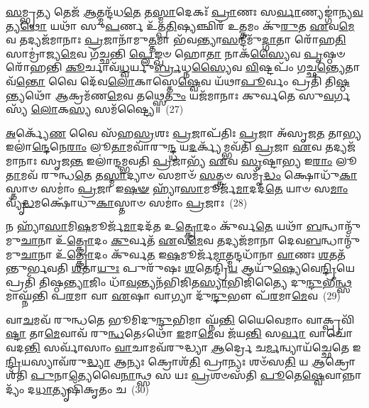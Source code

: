 {%
\-\ul{𑌸}\-𑌮𑍍𑌭𑍃\-\ul{𑌤𑍍𑌯} 𑌤𑍇𑌜᳴ \ul{𑌆}\-𑌤𑍍𑌮𑌨𑍍𑌦᳴𑌧\-\ul{𑌤𑍇} 𑌤\-\ul{𑌸𑍍𑌮𑌾}\-𑌦𑍇𑌕𑌃᳴ \ul{𑌪𑍍𑌰𑌾}\-𑌣𑌃 𑌸\-\ul{𑌰𑍍𑌵𑌾}\-𑌣𑍍𑌯𑌙𑍍𑌗𑌾॑𑌨𑍍𑌯\-\ul{𑌵}\-𑌤𑍍𑌯\-\ul{𑌥𑍋} 𑌯𑌥𑌾᳴ 𑌸𑍁\-\ul{𑌪}\-𑌰𑍍𑌣 𑌉᳴𑌤𑍍𑌪\-\ul{𑌤𑌿}\-𑌷𑍍𑌯𑌞𑍍𑌛𑌿𑌰᳴ 𑌉\-\ul{𑌤𑍍𑌤}\-𑌮𑌂 𑌕𑍁᳴\-\ul{𑌰𑍁}\-𑌤 \ul{𑌏}\-𑌵\-\ul{𑌮𑍇}\-𑌵 𑌤𑌦𑍍𑌯𑌜᳴𑌮𑌾𑌨𑌾𑌃 \ul{𑌪𑍍𑌰}\-𑌜𑌾𑌨𑌾᳴𑌮𑍁\-\ul{𑌤𑍍𑌤}\-𑌮𑌾 𑌭᳴𑌵𑌨𑍍𑌤𑍍𑌯𑌾\-\ul{𑌸}\-𑌨𑍍𑌦𑍀𑌮𑍁᳴\-\ul{𑌦𑍍𑌗𑌾}\-𑌤𑌾 𑌰𑍋᳴𑌹\-\ul{𑌤𑌿} 𑌸𑌾𑌮𑍍𑌰𑌾॑𑌜𑍍𑌯\-\ul{𑌮𑍇}\-𑌵 𑌗᳴𑌚𑍍𑌛𑌨𑍍𑌤𑌿 \ul{𑌪𑍍𑌲𑍇}\-𑌙𑍍𑌖𑍞 𑌹𑍋\-\ul{𑌤𑌾} 𑌨𑌾𑌕᳴\-\ul{𑌸𑍍𑌯𑍈}\-𑌵 \ul{𑌪𑍃}\-𑌷𑍍𑌠𑍞 𑌰𑍋᳴𑌹𑌨𑍍𑌤𑌿 \ul{𑌕𑍂}\-𑌰𑍍𑌚𑌾𑌵᳴\-\ul{𑌧𑍍𑌵}\-𑌰𑍍𑌯𑍁\-\ul{𑌰𑍍𑌬𑍍𑌰}\-𑌧𑍍𑌨\-\ul{𑌸𑍍𑌯𑍈}\-𑌵 \ul{𑌵𑌿}\-𑌷𑍍𑌟𑌪𑌂᳴ 𑌗𑌚𑍍𑌛\-\ul{𑌨𑍍𑌤𑍍𑌯𑍇}\-𑌤𑌾𑌵᳴\-\ul{𑌨𑍍𑌤𑍋} 𑌵𑍈 𑌦𑍇᳴𑌵\-\ul{𑌲𑍋}\-𑌕𑌾𑌸𑍍𑌤𑍇\-\ul{𑌷𑍍𑌵𑍇}\-𑌵 𑌯᳴𑌥𑌾\-\ul{𑌪𑍂}\-𑌰𑍍𑌵𑌂 𑌪𑍍𑌰𑌤𑌿᳴ 𑌤𑌿\-\ul{𑌷𑍍𑌠}\-𑌨𑍍𑌤𑍍𑌯𑌥𑍋᳴ \ul{𑌆}\-𑌕𑍍𑌰𑌮᳴𑌣\-\ul{𑌮𑍇}\-𑌵 𑌤𑌥𑍍𑌸𑍇\-\ul{𑌤𑍁𑌂} 𑌯𑌜᳴𑌮𑌾𑌨𑌾𑌃 𑌕𑍁𑌰𑍍𑌵𑌤𑍇 𑌸𑍁\-\ul{𑌵}\-𑌰𑍍𑌗𑌸𑍍𑌯᳴ \ul{𑌲𑍋}\-𑌕\-\ul{𑌸𑍍𑌯} 𑌸𑌮᳴𑌷𑍍𑌟𑍍𑌯𑍈॥~(27)

{\anuvakamend[{𑌸𑌦᳴𑌸𑌃 𑌸𑌪𑍍𑌤\-\ul{𑌦}\-𑌶𑌂 \ul{𑌪𑍍𑌰}\-𑌜𑌾𑌪᳴𑌤𑍇𑌰𑍍𑌗𑌾𑌯𑌤𑌿 \ul{𑌦𑌿}\-𑌗𑍍𑌭𑍍𑌯 \ul{𑌏}\-𑌵𑌾𑌨𑍍𑌨𑌾\-\ul{𑌦𑍍𑌯}\-𑌮𑍍𑌪𑍍𑌰𑌤𑍍𑌯𑍇𑌕𑌾᳴\-𑌦𑌶 𑌚}]}%

\-\ul{𑌅}\-𑌰𑍍𑌕𑍍𑌯𑍇᳴\-\ul{𑌣} 𑌵𑍈 𑌸᳴𑌹\-\ul{𑌸𑍍𑌰}\-𑌶𑌃 \ul{𑌪𑍍𑌰}\-𑌜𑌾𑌪᳴𑌤𑌿𑌃 \ul{𑌪𑍍𑌰}\-𑌜𑌾 𑌅᳴𑌸𑍃𑌜\-\ul{𑌤} 𑌤𑌾\-\ul{𑌭𑍍𑌯} 𑌇𑌲𑌾॑\-\ul{𑌨𑍍𑌦𑍇}\-𑌨𑍇\-\ul{𑌰𑌾𑌂} 𑌲𑍂\-\ul{𑌤𑌾}\-𑌮𑌵𑌾᳴𑌰𑍁\-\ul{𑌨𑍍𑌦𑍍𑌧} 𑌯\-\ul{𑌦}\-𑌰𑍍𑌕𑍍𑌯᳴𑌮𑍍𑌭𑌵᳴𑌤𑌿 \ul{𑌪𑍍𑌰}\-𑌜𑌾 \ul{𑌏}\-𑌵 𑌤𑌦𑍍𑌯𑌜᳴𑌮𑌾𑌨𑌾𑌃 𑌸𑍃𑌜\-\ul{𑌨𑍍𑌤} 𑌇𑌲𑌾॑𑌨𑍍𑌦𑌮𑍍𑌭𑌵𑌤𑌿 \ul{𑌪𑍍𑌰}\-𑌜𑌾𑌭𑍍𑌯᳴ \ul{𑌏}\-𑌵 \ul{𑌸𑍃}\-𑌷𑍍𑌟𑌾\-\ul{𑌭𑍍𑌯} 𑌇\-\ul{𑌰𑌾𑌂} 𑌲𑍂\-\ul{𑌤𑌾}\-𑌮𑌵᳴ 𑌰𑍁𑌨𑍍𑌧\-\ul{𑌤𑍇} 𑌤\-\ul{𑌸𑍍𑌮𑌾}\-𑌦𑍍𑌯𑌾𑍞 𑌸𑌮𑌾𑍞᳴ \ul{𑌸}\-𑌤𑍍𑌤𑍍𑌰𑍞 𑌸𑌮𑍃᳴\-\ul{𑌦𑍍𑌧𑌂} 𑌕𑍍𑌷𑍋𑌧𑍁᳴\-\ul{𑌕𑌾}\-𑌸𑍍𑌤𑌾𑍞 𑌸𑌮𑌾𑌂॑ \ul{𑌪𑍍𑌰}\-𑌜𑌾 𑌇\-\ul{𑌷}\-\-\ul{𑍟} 𑌹𑍍𑌯𑌾᳴\-\ul{𑌸𑌾}\-𑌮𑍂𑌰𑍍𑌜᳴\-\ul{𑌮𑌾}\-𑌦𑌦᳴\-\ul{𑌤𑍇} 𑌯𑌾𑍞 𑌸\-\ul{𑌮𑌾𑌂} 𑌵𑍍𑌯𑍃᳴\-\ul{𑌦𑍍𑌧}\-𑌮𑌕𑍍𑌷𑍋᳴𑌧𑍁\-\ul{𑌕𑌾}\-𑌸𑍍𑌤𑌾𑍞 𑌸𑌮𑌾𑌂॑ \ul{𑌪𑍍𑌰}\-𑌜𑌾𑌃~(28)

𑌨 𑌹𑍍𑌯𑌾᳴\-\ul{𑌸𑌾}\-𑌮𑌿\-\ul{𑌷}\-𑌮𑍂𑌰𑍍𑌜᳴\-\ul{𑌮𑌾}\-𑌦𑌦᳴𑌤 𑌉\-\ul{𑌤𑍍𑌕𑍍𑌰𑍋}\-𑌦𑌂 𑌕𑍁᳴𑌰𑍍𑌵\-\ul{𑌤𑍇} 𑌯𑌥𑌾᳴ \ul{𑌬}\-𑌨𑍍𑌧𑌾𑌨𑍍𑌮𑍁᳴𑌮𑍁\-\ul{𑌚𑌾}\-𑌨𑌾 𑌉᳴\-\ul{𑌤𑍍𑌕𑍍𑌰𑍋}\-𑌦𑌂 \ul{𑌕𑍁}\-𑌰𑍍𑌵𑌤᳴ \ul{𑌏}\-𑌵\-\ul{𑌮𑍇}\-𑌵 𑌤𑌦𑍍𑌯𑌜᳴𑌮𑌾𑌨𑌾 𑌦𑍇𑌵\-\ul{𑌬}\-𑌨𑍍𑌧𑌾𑌨𑍍𑌮𑍁᳴𑌮𑍁\-\ul{𑌚𑌾}\-𑌨𑌾 𑌉᳴\-\ul{𑌤𑍍𑌕𑍍𑌰𑍋}\-𑌦𑌂 𑌕𑍁᳴𑌰𑍍𑌵\-\ul{𑌤} 𑌇\-\ul{𑌷}\-𑌮𑍂𑌰𑍍𑌜᳴\-\ul{𑌮𑌾}\-𑌤𑍍𑌮𑌨𑍍𑌦𑌧𑌾᳴𑌨𑌾 \ul{𑌵𑌾}\-𑌣𑌃 \ul{𑌶}\-𑌤𑌤᳴𑌨𑍍𑌤𑍁𑌰𑍍𑌭𑌵𑌤𑌿 \ul{𑌶}\-𑌤𑌾\-\ul{𑌯𑍁𑌃} 𑌪𑍁𑌰𑍁᳴𑌷𑌃 \ul{𑌶}\-𑌤𑍇𑌨𑍍𑌦𑍍𑌰𑌿᳴\-\ul{𑌯} 𑌆𑌯𑍁᳴\-\ul{𑌷𑍍𑌯𑍇}\-𑌵𑍇\-\ul{𑌨𑍍𑌦𑍍𑌰𑌿}\-𑌯𑍇 𑌪𑍍𑌰𑌤𑌿᳴ 𑌤𑌿𑌷𑍍𑌠\-\ul{𑌨𑍍𑌤𑍍𑌯𑌾}\-𑌜𑌿𑌂 𑌧𑌾᳴\-\ul{𑌵}\-𑌨𑍍𑌤𑍍𑌯𑌨᳴𑌭𑌿𑌜𑌿𑌤\-\ul{𑌸𑍍𑌯𑌾}\-𑌭𑌿𑌜𑌿᳴𑌤𑍍𑌯𑍈 𑌦𑍁\-\ul{𑌨𑍍𑌦𑍁}\-𑌭𑍀\-\ul{𑌨𑍍𑌥𑍍𑌸}\-𑌮𑌾𑌘𑍍𑌨᳴𑌨𑍍𑌤𑌿 𑌪\-\ul{𑌰}\-𑌮𑌾 𑌵𑌾 \ul{𑌏}\-𑌷𑌾 𑌵𑌾𑌗𑍍𑌯𑌾 𑌦𑍁᳴\-\ul{𑌨𑍍𑌦𑍁}\-𑌭𑍗 𑌪᳴\-\ul{𑌰}\-𑌮𑌾\-\ul{𑌮𑍇}\-𑌵~(29)

𑌵𑌾\-\ul{𑌚}\-𑌮𑌵᳴ 𑌰𑍁𑌨𑍍𑌧𑌤𑍇 𑌭𑍂𑌮𑌿𑌦𑍁\-\ul{𑌨𑍍𑌦𑍁}\-𑌭𑌿𑌮𑌾 𑌘𑍍𑌨᳴\-\ul{𑌨𑍍𑌤𑌿} 𑌯𑍈𑌵𑍇𑌮𑌾𑌂 𑌵𑌾𑌕𑍍𑌪𑍍𑌰𑌵𑌿᳴\-\ul{𑌷𑍍𑌟𑌾} 𑌤𑌾\-\ul{𑌮𑍇}\-𑌵𑌾𑌵᳴ 𑌰𑍁\-\ul{𑌨𑍍𑌧}\-𑌤𑍇\-𑌽𑌥𑍋᳴ \ul{𑌇}\-𑌮𑌾\-\ul{𑌮𑍇}\-𑌵 𑌜᳴𑌯\-\ul{𑌨𑍍𑌤𑌿} 𑌸\-\ul{𑌰𑍍𑌵𑌾} 𑌵𑌾𑌚𑍋᳴ 𑌵𑌦\-\ul{𑌨𑍍𑌤𑌿} 𑌸𑌰𑍍𑌵𑌾᳴𑌸𑌾𑌂 \ul{𑌵𑌾}\-𑌚𑌾𑌮𑌵᳴𑌰𑍁𑌦𑍍𑌧𑍍𑌯𑌾 \ul{𑌆}\-𑌰𑍍𑌦𑍍𑌰𑍇 𑌚\-\ul{𑌰𑍍𑌮}\-𑌨𑍍𑌵𑍍𑌯𑌾𑌯᳴𑌚𑍍𑌛𑍇𑌤𑍇 𑌇\-\ul{𑌨𑍍𑌦𑍍𑌰𑌿}\-𑌯𑌸𑍍𑌯𑌾𑌵᳴𑌰𑍁\-\ul{𑌦𑍍𑌧𑍍𑌯𑌾} 𑌆𑌨𑍍𑌯𑌃 𑌕𑍍𑌰𑍋𑌶᳴\-\ul{𑌤𑌿} 𑌪𑍍𑌰𑌾𑌨𑍍𑌯𑌃 𑌶𑍞᳴𑌸\-\ul{𑌤𑌿} 𑌯 \ul{𑌆}\-𑌕𑍍𑌰𑍋𑌶᳴𑌤𑌿 \ul{𑌪𑍁}\-𑌨𑌾\-\ul{𑌤𑍍𑌯𑍇}\-𑌵𑍈\-\ul{𑌨𑌾}\-𑌨𑍍𑌥𑍍𑌸 𑌸 𑌯𑌃 \ul{𑌪𑍍𑌰}\-𑌶𑍞𑌸᳴𑌤𑌿 \ul{𑌪𑍂}\-𑌤𑍇\-\ul{𑌷𑍍𑌵𑍇}\-𑌵𑌾𑌨𑍍𑌨𑌾𑌦𑍍𑌯𑌂᳴ 𑌦\-\ul{𑌧𑌾}\-𑌤𑍍𑌯𑍃𑌷𑌿᳴𑌕𑍃𑌤𑌂 𑌚~(30)

}
